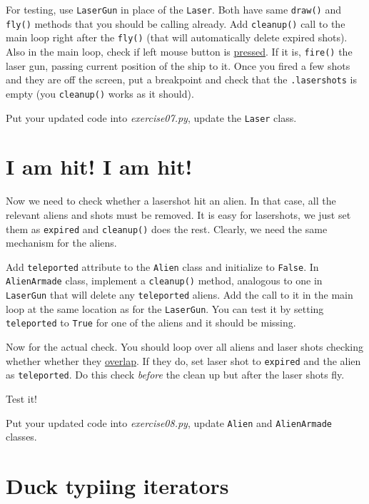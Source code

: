 \documentclass[
]{book}
\begin{document}
For testing, use \texttt{LaserGun} in place of the \texttt{Laser}. Both have same \texttt{draw()} and \texttt{fly()} methods that you should be calling already. Add \texttt{cleanup()} call to the main loop right after the \texttt{fly()} (that will automatically delete expired shots). Also in the main loop, check if left mouse button is \href{https://psychopy.org/api/event.html\#psychopy.event.Mouse.getPressed}{pressed}. If it is, \texttt{fire()} the laser gun, passing current position of the ship to it. Once you fired a few shots and they are off the screen, put a breakpoint and check that the \texttt{.lasershots} is empty (you \texttt{cleanup()} works as it should).

Put your updated code into \emph{exercise07.py}, update the \texttt{Laser} class.

\hypertarget{i-am-hit-i-am-hit}{%
\section{I am hit! I am hit!}\label{i-am-hit-i-am-hit}}

Now we need to check whether a lasershot hit an alien. In that case, all the relevant aliens and shots must be removed. It is easy for lasershots, we just set them as \texttt{expired} and \texttt{cleanup()} does the rest. Clearly, we need the same mechanism for the aliens.

Add \texttt{teleported} attribute to the \texttt{Alien} class and initialize to \texttt{False}. In \texttt{AlienArmade} class, implement a \texttt{cleanup()} method, analogous to one in \texttt{LaserGun} that will delete any \texttt{teleported} aliens. Add the call to it in the main loop at the same location as for the \texttt{LaserGun}. You can test it by setting \texttt{teleported} to \texttt{True} for one of the aliens and it should be missing.

Now for the actual check. You should loop over all aliens and laser shots checking whether whether they \href{https://psychopy.org/api/visual/imagestim.html\#psychopy.visual.ImageStim.overlaps}{overlap}. If they do, set laser shot to \texttt{expired} and the alien as \texttt{teleported}. Do this check \emph{before} the clean up but after the laser shots fly.

Test it!

Put your updated code into \emph{exercise08.py}, update \texttt{Alien} and \texttt{AlienArmade} classes.

\hypertarget{duck-typiing-iterators}{%
\section{Duck typiing iterators}\label{duck-typiing-iterators}}
\end{document}
